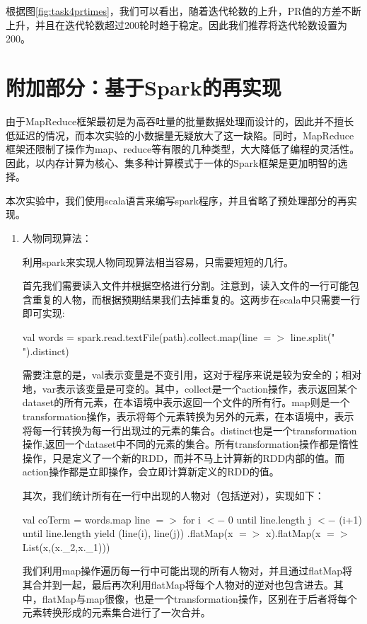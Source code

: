 \documentclass[a4paper,UTF8]{article}
\numberwithin{equation}{section}
\begin{document}
\begin{enumerate}[ {(}1{)}]
		根据图\ref{fig:task4prtimes}，我们可以看出，随着迭代轮数的上升，PR值的方差不断上升，并且在迭代轮数超过200轮时趋于稳定。因此我们推荐将迭代轮数设置为200。
		
	\end{enumerate}		
	\section{附加部分：基于Spark的再实现}
	由于MapReduce框架最初是为高吞吐量的批量数据处理而设计的，因此并不擅长低延迟的情况，而本次实验的小数据量无疑放大了这一缺陷。同时，MapReduce框架还限制了操作为map、reduce等有限的几种类型，大大降低了编程的灵活性。因此，以内存计算为核心、集多种计算模式于一体的Spark框架是更加明智的选择。
	
	本次实验中，我们使用scala语言来编写spark程序，并且省略了预处理部分的再实现。
	\begin{enumerate}[ {(}1{)}]
		\item 人物同现算法：
		
		利用spark来实现人物同现算法相当容易，只需要短短的几行。
		
		首先我们需要读入文件并根据空格进行分割。注意到，读入文件的一行可能包含重复的人物，而根据预期结果我们去掉重复的。这两步在scala中只需要一行即可实现:		
		\begin{center}
		val words = spark.read.textFile(path).collect.map(line $=>$ line.split(" ").distinct)
		\end{center}
		需要注意的是，val表示变量是不变引用，这对于程序来说是较为安全的；相对地，var表示该变量是可变的。其中，collect是一个action操作，表示返回某个dataset的所有元素，在本语境中表示返回一个文件的所有行。map则是一个transformation操作，表示将每个元素转换为另外的元素，在本语境中，表示将每一行转换为每一行出现过的元素的集合。distinct也是一个transformation操作,返回一个dataset中不同的元素的集合。所有transformation操作都是惰性操作，只是定义了一个新的RDD，而并不马上计算新的RDD内部的值。而action操作都是立即操作，会立即计算新定义的RDD的值。
	
		其次，我们统计所有在一行中出现的人物对（包括逆对），实现如下：	
		\begin{center}
		val coTerm = words.map { line $=>$
			for{
				i $<-$ 0 until line.length
				j $<-$ (i+1) until line.length
			} yield {
				(line(i), line(j))
			} 
		}.flatMap(x $=>$ x).flatMap(x $=>$ List(x,(x.\_2,x.\_1)))
		\end{center}
		我们利用map操作遍历每一行中可能出现的所有人物对，并且通过flatMap将其合并到一起，最后再次利用flatMap将每个人物对的逆对也包含进去。其中，flatMap与map很像，也是一个transformation操作，区别在于后者将每个元素转换形成的元素集合进行了一次合并。
		

\end{enumerate}
\end{document}

